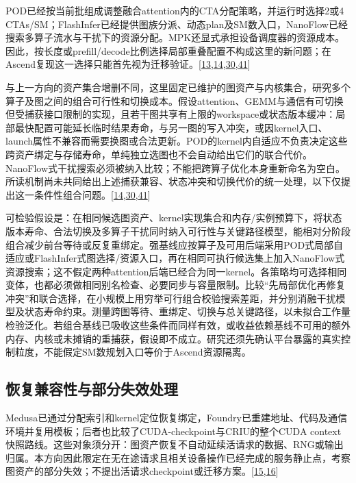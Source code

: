 \documentclass[
  UTF8,
  zihao=5]{ctexart}
\begin{document}
POD已经按当前批组成调整融合attention内的CTA分配策略，并运行时选择2或4
CTAs/SM；FlashInfer已经提供图族分派、动态plan及SM数入口，NanoFlow已经搜索多算子流水与干扰下的资源分配。MPK还显式承担设备调度器的资源成本。因此，按长度或prefill/decode比例选择局部重叠配置不构成这里的新问题；在Ascend复现这一选择只能首先视为迁移验证。{[}\protect\hyperlink{ref-cheng2026mpk}{13},\protect\hyperlink{ref-ye2025flashinfer}{14},\protect\hyperlink{ref-zhu2025nanoflow}{30},\protect\hyperlink{ref-kamath2025pod}{41}{]}

与上一方向的资产集合增删不同，这里固定已维护的图资产与内核集合，研究多个算子及图之间的组合可行性和切换成本。假设attention、GEMM与通信有可切换但受捕获接口限制的实现，且若干图共享有上限的workspace或状态版本缓冲：局部最快配置可能延长临时结果寿命，与另一图的写入冲突，或因kernel入口、launch属性不兼容而需要换图或合法更新。POD的kernel内自适应不负责决定这些跨资产绑定与存储寿命，单纯独立选图也不会自动给出它们的联合代价。NanoFlow式干扰搜索必须被纳入比较；不能把跨算子优化本身重新命名为空白。所读机制尚未共同给出上述捕获兼容、状态冲突和切换代价的统一处理，以下仅提出这一条件性组合问题。{[}\protect\hyperlink{ref-ye2025flashinfer}{14},\protect\hyperlink{ref-zhu2025nanoflow}{30},\protect\hyperlink{ref-kamath2025pod}{41}{]}

可检验假设是：在相同候选图资产、kernel实现集合和内存/实例预算下，将状态版本寿命、合法切换及多算子干扰同时纳入可行性与关键路径模型，能相对分阶段组合减少前台等待或反复重绑定。强基线应按算子及可用后端采用POD式局部自适应或FlashInfer式图选择/资源入口，再在相同可执行候选集上加入NanoFlow式资源搜索；这不假定两种attention后端已经合为同一kernel。各策略均可选择相同变体，也都必须做相同别名检查、必要同步与容量限制。比较``先局部优化再修复冲突''和联合选择，在小规模上用穷举可行组合校验搜索差距，并分别消融干扰模型及状态寿命约束。测量跨图等待、重绑定、切换与总关键路径，以未拟合工作量检验泛化。若组合基线已吸收这些条件而同样有效，或收益依赖基线不可用的额外内存、内核或未摊销的重捕获，假设即不成立。研究还须先确认平台暴露的真实控制粒度，不能假定SM数规划入口等价于Ascend资源隔离。

\hypertarget{ux6062ux590dux517cux5bb9ux6027ux4e0eux90e8ux5206ux5931ux6548ux5904ux7406}{%
\subsection{恢复兼容性与部分失效处理}\label{ux6062ux590dux517cux5bb9ux6027ux4e0eux90e8ux5206ux5931ux6548ux5904ux7406}}

Medusa已通过分配索引和kernel定位恢复绑定，Foundry已重建地址、代码及通信环境并复用模板；后者也比较了CUDA-checkpoint与CRIU的整个CUDA
context快照路线。这些对象须分开：图资产恢复不自动延续活请求的数据、RNG或输出归属。本方向因此限定在无在途请求且相关设备操作已经完成的服务静止点，考察图资产的部分失效；不提出活请求checkpoint或迁移方案。{[}\protect\hyperlink{ref-zeng2025medusa}{15},\protect\hyperlink{ref-liu2026foundry}{16}{]}
\end{document}
